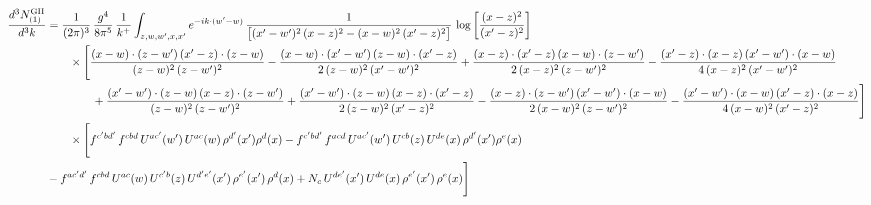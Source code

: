 \documentclass[10pt]{article}
\begin{document}
\begin{align}
\frac{d^{3}N^{\rm GII}_{(1)}}{d^{3}k}&=\frac{1}{(2\pi)^{3}}\,\frac{g^{4}}{8\pi^{5}}\,\frac{1}{k^{+}}\int_{z,w,w^{\prime},x,x^{\prime}}e^{-ik\cdot(w^{\prime}-w)}\,\frac{1}{\big[(x^{\prime}-w^{\prime})^{2}\,(x-z)^{2}-(x-w)^{2}\,(x^{\prime}-z)^{2}\big]}\,\log\left[\frac{(x-z)^{2}}{(x^{\prime}-z)^{2}}\right]\notag\\
&\qquad\times\Bigg[\frac{(x-w)\cdot(z-w^{\prime})\,(x^{\prime}-z)\cdot(z-w)}{(z-w)^{2}\,(z-w^{\prime})^{2}}-\frac{(x-w)\cdot(x^{\prime}-w^{\prime})\,(z-w)\cdot(x^{\prime}-z)}{2\,(z-w)^{2}\,(x^{\prime}-w^{\prime})^{2}}+\frac{(x-z)\cdot(x^{\prime}-z)\,(x-w)\cdot(z-w^{\prime})}{2\,(x-z)^{2}\,(z-w^{\prime})^{2}}-\frac{(x^{\prime}-z)\cdot(x-z)\,(x^{\prime}-w^{\prime})\cdot(x-w)}{4\,(x-z)^{2}\,(x^{\prime}-w^{\prime})^{2}}\notag\\&\qquad\qquad+\frac{(x^{\prime}-w^{\prime})\cdot(z-w)\,(x-z)\cdot(z-w^{\prime})}{(z-w)^{2}\,(z-w^{\prime})^{2}}+\frac{(x^{\prime}-w^{\prime})\cdot(z-w)\,(x-z)\cdot(x^{\prime}-z)}{2\,(z-w)^{2}\,(x^{\prime}-z)^{2}}-\frac{(x-z)\cdot(z-w^{\prime})\,(x^{\prime}-w^{\prime})\cdot(x-w)}{2\,(x-w)^{2}\,(z-w^{\prime})^{2}}-\frac{(x^{\prime}-w^{\prime})\cdot(x-w)\,(x^{\prime}-z)\cdot(x-z)}{4\,(x-w)^{2}\,(x^{\prime}-z)^{2}}\Bigg]\notag\\
&\qquad\times\Bigg[f^{c^{\prime}bd^{\prime}}\,f^{cbd}\, U^{ac^{\prime}}(w^{\prime})\,U^{ac}(w)\,\rho^{d^{\prime}}(x^{\prime})\rho^{d}(x)- f^{c^{\prime}bd^{\prime}}\,f^{acd}\,U^{ac^{\prime}}(w^{\prime})\,U^{cb}(z)\,U^{de}(x)\,\rho^{d^{\prime}}(x^{\prime})\rho^{e}(x) \notag \\ & -f^{ac^{\prime}d^{\prime}}\,f^{cbd}\,U^{ac}(w)\,U^{c^{\prime}b}(z)\,U^{d^{\prime}e^{\prime}}(x^{\prime})\,\rho^{e^{\prime}}(x^{\prime})\,\rho^{d}(x) +N_{c}\,U^{de^{\prime}}(x^{\prime})\,U^{de}(x)\,\rho^{e^{\prime}}(x^{\prime})\,\rho^{e}(x)\Bigg]
\end{align}
\end{document}
